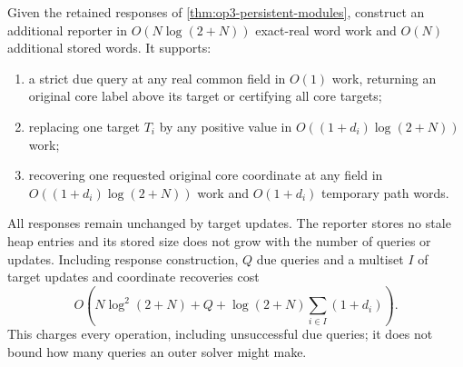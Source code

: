\begin{theorem}
\label{thm:op3-module-reporter}
Given the retained responses of \cref{thm:op3-persistent-modules}, construct
an additional reporter in $O(N\log(2+N))$ exact-real word work and $O(N)$
additional stored words. It supports:
\begin{enumerate}
\item a strict due query at any real common field in $O(1)$ work, returning
an original core label above its target or certifying all core targets;
\item replacing one target $T_i$ by any positive value in
$O((1+d_i)\log(2+N))$ work;
\item recovering one requested original core coordinate at any field in
$O((1+d_i)\log(2+N))$ work and $O(1+d_i)$ temporary path words.
\end{enumerate}
All responses remain unchanged by target updates. The reporter stores no
stale heap entries and its stored size does not grow with the number of
queries or updates. Including response construction, $Q$ due queries and
a multiset $I$ of target updates and coordinate recoveries cost
\begin{equation}
 O\!\left(N\log^2(2+N)+Q+
       \log(2+N)\sum_{i\in I}(1+d_i)\right).
 \label{eq:op3-module-reporter-work}
\end{equation}
This charges every operation, including unsuccessful due queries; it does
not bound how many queries an outer solver might make.
\end{theorem}
